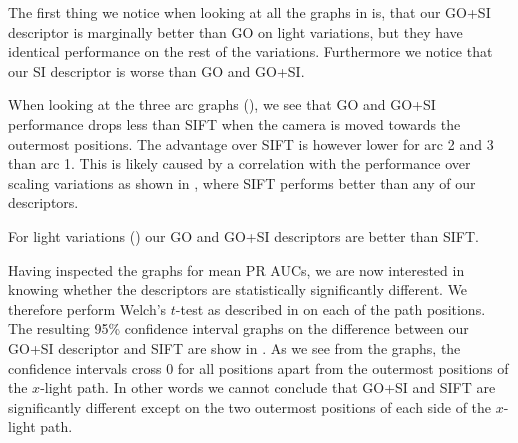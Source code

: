 \documentclass[thesis.tex]{subfiles}
\begin{document}
The first thing we notice when looking at all the graphs in  is, that our GO+SI descriptor is marginally better than GO on light variations, but they have identical performance on the rest of the variations. Furthermore we notice that our SI descriptor is worse than GO and GO+SI.

When looking at the three arc graphs (), we see that GO and GO+SI performance drops less than SIFT when the camera is moved towards the outermost positions. The advantage over SIFT is however lower for arc 2 and 3 than arc 1. This is likely caused by a correlation with the performance over scaling variations as shown in , where SIFT performs better than any of our descriptors.

For light variations () our GO and GO+SI descriptors are better than SIFT.

Having inspected the graphs for mean PR AUCs, we are now interested in knowing whether the descriptors are statistically significantly different. We therefore perform Welch's $t$-test as described in  on each of the path positions. The resulting 95\% confidence interval graphs on the difference between our GO+SI descriptor and SIFT are show in . As we see from the graphs, the confidence intervals cross 0 for all positions apart from the outermost positions of the $x$-light path. In other words we cannot conclude that GO+SI and SIFT are significantly different except on the two outermost positions of each side of the $x$-light path.
\end{document}
